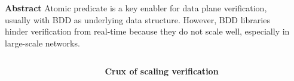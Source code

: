 \documentclass[final]{beamer}
\newlength{\sepwidthB}
\newlength{\colwidthB}
\newcommand{\separatorcolumnB}{\begin{column}{\sepwidthB}\end{column}}
\begin{document}

\begin{frame}[t]
\begin{columns}[t]
  \begin{column}{0.49\paperwidth}
    \begin{block}{\Large{\textbf{Abstract}}}
      \large
      Atomic predicate is a key enabler for data plane verification, usually with
      BDD as underlying data structure. However, BDD libraries hinder verification
      from real-time because they do not scale well, especially in large-scale networks.

    \end{block}
  \end{column}
  \begin{column}{0.39\paperwidth}


  \end{column}
\end{columns}

\begin{columns}
\separatorcolumnB
  \begin{column}[T]{\colwidthB}
    \begin{block}{\Large{\textbf{Crux of scaling verification}}}
    \vspace{0.5cm}
    \large


\end{block}
\end{column}
\end{columns}
\end{frame}
\end{document}
